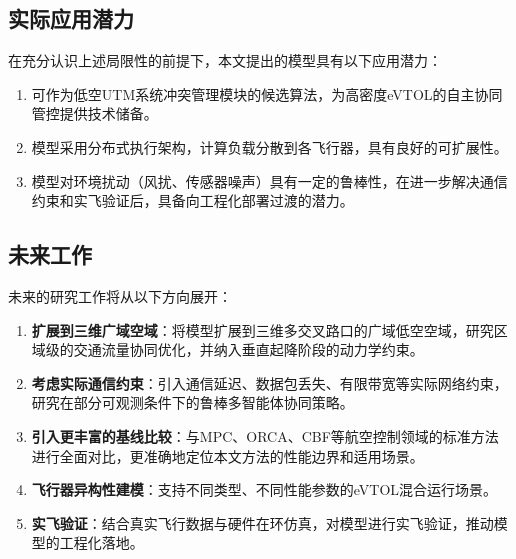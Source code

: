 \documentclass[12pt,a4paper,UTF8]{ctexart}
\begin{document}
\subsection{实际应用潜力}
在充分认识上述局限性的前提下，本文提出的模型具有以下应用潜力：
\begin{enumerate}[label=(\arabic*)]
    \item 可作为低空UTM系统冲突管理模块的候选算法，为高密度eVTOL的自主协同管控提供技术储备。
    \item 模型采用分布式执行架构，计算负载分散到各飞行器，具有良好的可扩展性。
    \item 模型对环境扰动（风扰、传感器噪声）具有一定的鲁棒性，在进一步解决通信约束和实飞验证后，具备向工程化部署过渡的潜力。
\end{enumerate}

\subsection{未来工作}
未来的研究工作将从以下方向展开：
\begin{enumerate}[label=(\arabic*)]
    \item \textbf{扩展到三维广域空域}：将模型扩展到三维多交叉路口的广域低空空域，研究区域级的交通流量协同优化，并纳入垂直起降阶段的动力学约束。
    \item \textbf{考虑实际通信约束}：引入通信延迟、数据包丢失、有限带宽等实际网络约束，研究在部分可观测条件下的鲁棒多智能体协同策略。
    \item \textbf{引入更丰富的基线比较}：与MPC、ORCA、CBF等航空控制领域的标准方法进行全面对比，更准确地定位本文方法的性能边界和适用场景。
    \item \textbf{飞行器异构性建模}：支持不同类型、不同性能参数的eVTOL混合运行场景。
    \item \textbf{实飞验证}：结合真实飞行数据与硬件在环仿真，对模型进行实飞验证，推动模型的工程化落地。
\end{enumerate}
\end{document}
